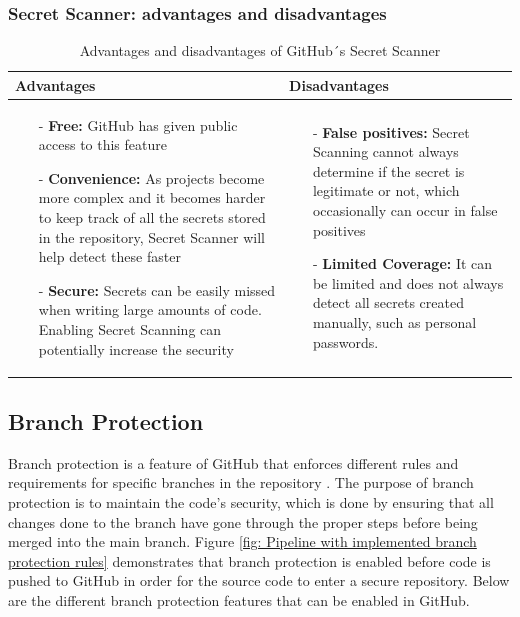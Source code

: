 \subsubsection{Secret Scanner: advantages and disadvantages}
\begin{table}[H]
\centering
\begin{tabular}{|>{\raggedright\arraybackslash}p{6cm}|>{\raggedright\arraybackslash}p{6cm}|}
\hline
\textbf{Advantages} & \textbf{Disadvantages} \\
\hline
\begin{itemize}
\item [-] \textbf{Free:} GitHub has given public access to this feature 
\vspace{5pt}
\item [-]\textbf{Convenience:} As projects become more complex and it becomes harder to keep track of all the secrets stored in the repository, Secret Scanner will help detect these faster 
\vspace{5pt}
\item [-] \textbf{Secure:} Secrets can be easily missed when writing large amounts of code. Enabling Secret Scanning can potentially increase the security 
\end{itemize}
&
   \begin{itemize}
\item [-] \textbf{False positives:} Secret Scanning cannot always determine if the secret is legitimate or not, which occasionally can occur in false positives
\vspace{5pt}
\item [-] \textbf{Limited Coverage:} It can be limited and does not always detect all secrets created manually, such as personal passwords. 
    \end{itemize}
    \\
    \hline
    \end{tabular}
    \caption{Advantages and disadvantages of GitHub´s Secret Scanner}\cite{Secret_Scanner_pros_cons}
    \label{tab: Secret_Scanner}
    \end{table}
    
\newpage
\subsection{Branch Protection}
\label{branchprotection}
Branch protection is a feature of GitHub that enforces different rules and requirements for specific branches in the repository \cite{ProtectedBranches}. The purpose of branch protection is to maintain the code's security, which is done by ensuring that all changes done to the branch have gone through the proper steps before being merged into the main branch. Figure \ref{fig: Pipeline with implemented branch protection rules} demonstrates that branch protection is enabled before code is pushed to GitHub in order for the source code to enter a secure repository. Below are the different branch protection features that can be enabled in GitHub. 

